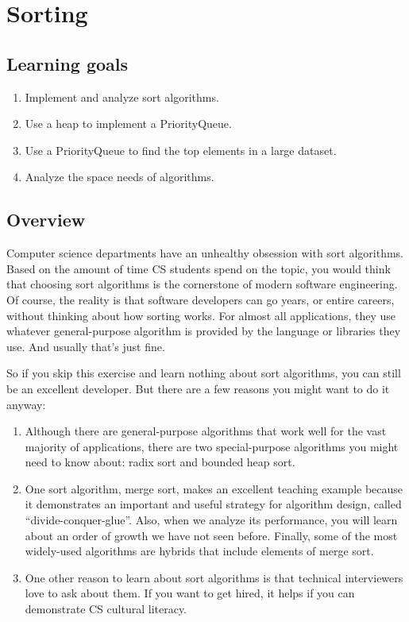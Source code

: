 \documentclass[12pt]{book}
\theoremstyle{exercise}
\begin{document}
{{{\chapter{Sorting}

\section{Learning goals}\label{learning-goals-11}

\begin{enumerate}
\def\labelenumi{\arabic{enumi}.}
\itemsep1pt\parskip0pt
\item
  Implement and analyze sort algorithms.
\item
  Use a heap to implement a PriorityQueue.
\item
  Use a PriorityQueue to find the top elements in a large dataset.
\item
  Analyze the space needs of algorithms.
\end{enumerate}

\section{Overview}\label{overview-19}

Computer science departments have an unhealthy obsession with sort
algorithms. Based on the amount of time CS students spend on the topic,
you would think that choosing sort algorithms is the cornerstone of
modern software engineering. Of course, the reality is that software
developers can go years, or entire careers, without thinking about how
sorting works. For almost all applications, they use whatever
general-purpose algorithm is provided by the language or libraries they
use. And usually that's just fine.

So if you skip this exercise and learn nothing about sort algorithms, you can
still be an excellent developer. But there are a few reasons you might
want to do it anyway:

\begin{enumerate}
\def\labelenumi{\arabic{enumi}.}
\item
  Although there are general-purpose algorithms that work well for the
  vast majority of applications, there are two special-purpose
  algorithms you might need to know about: radix sort and bounded heap
  sort.
\item
  One sort algorithm, merge sort, makes an excellent teaching example
  because it demonstrates an important and useful strategy for algorithm
  design, called ``divide-conquer-glue''. Also, when we analyze its
  performance, you will learn about an order of growth we have not seen
  before. Finally, some of the most widely-used algorithms are hybrids
  that include elements of merge sort.
\item
  One other reason to learn about sort algorithms is that technical
  interviewers love to ask about them. If you want to get hired, it
  helps if you can demonstrate CS cultural literacy.
\end{enumerate}

}}}
\end{document}
